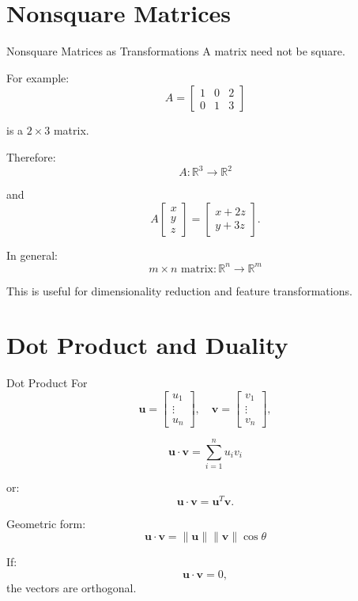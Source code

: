\documentclass[aspectratio=169]{beamer}
\begin{document}
\section{Nonsquare Matrices}

\begin{frame}{Nonsquare Matrices as Transformations}
A matrix need not be square.

For example:
\[
A=
\begin{bmatrix}
1&0&2\\
0&1&3
\end{bmatrix}
\]

is a $2\times3$ matrix.

Therefore:
\[
\boxed{A:\mathbb R^3\rightarrow\mathbb R^2}
\]

and
\[
A
\begin{bmatrix}x\\y\\z\end{bmatrix}
=
\begin{bmatrix}
x+2z\\
y+3z
\end{bmatrix}.
\]

In general:
\[
\boxed{
m\times n\text{ matrix}:
\mathbb R^n\rightarrow\mathbb R^m
}
\]

This is useful for dimensionality reduction and feature transformations.
\end{frame}

\section{Dot Product and Duality}

\begin{frame}{Dot Product}
For
\[
\mathbf u=
\begin{bmatrix}u_1\\\vdots\\u_n\end{bmatrix},
\quad
\mathbf v=
\begin{bmatrix}v_1\\\vdots\\v_n\end{bmatrix},
\]

\[
\boxed{
\mathbf u\cdot\mathbf v
=
\sum_{i=1}^{n}u_iv_i
}
\]

or:
\[
\mathbf u\cdot\mathbf v=\mathbf u^T\mathbf v.
\]

Geometric form:
\[
\boxed{
\mathbf u\cdot\mathbf v
=
\|\mathbf u\|\|\mathbf v\|\cos\theta
}
\]

If:
\[
\mathbf u\cdot\mathbf v=0,
\]
the vectors are orthogonal.
\end{frame}
\end{document}
